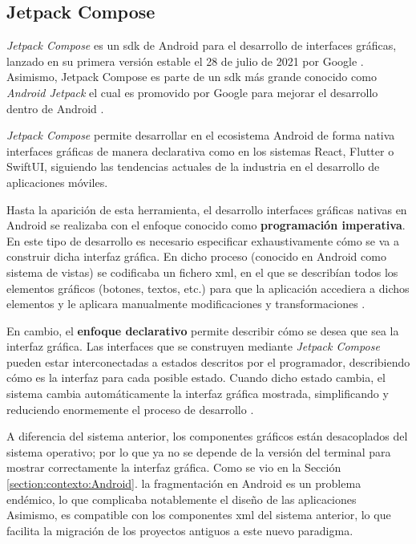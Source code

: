     \subsection{Jetpack Compose}

        \textit{Jetpack Compose} es un \gls{sdk} de Android para el desarrollo de interfaces gráficas, lanzado en su primera versión estable el 28 de julio de 2021 por Google \cite{bellini_jetpack_2021}. Asimismo, Jetpack Compose es parte de un \gls{sdk} más grande conocido como \textit{Android Jetpack} el cual es promovido por Google para mejorar el desarrollo dentro de Android \cite{huaman_que_2018} \cite{android_developers_recursos_nodate}. 
        
        \textit{Jetpack Compose} permite desarrollar en el ecosistema Android de forma nativa interfaces gráficas de manera declarativa como en los sistemas React, Flutter o SwiftUI, siguiendo las tendencias actuales de la industria en el desarrollo de aplicaciones móviles. 

        Hasta la aparición de esta herramienta, el desarrollo interfaces gráficas nativas en Android se realizaba con el enfoque conocido como \textbf{programación imperativa}. En este tipo de desarrollo es necesario especificar exhaustivamente cómo se va a construir dicha interfaz gráfica. En dicho proceso (conocido en Android como sistema de vistas) se codificaba un fichero \gls{xml}, en el que se describían todos los elementos gráficos (botones, textos, etc.) para que la aplicación accediera a dichos elementos y le aplicara manualmente modificaciones y transformaciones \cite{deloitte_spain_programacion_2021}. 

        En cambio, el \textbf{enfoque declarativo} permite describir cómo se desea que sea la interfaz gráfica. Las interfaces que se construyen mediante \textit{Jetpack Compose} pueden estar interconectadas a estados descritos por el programador, describiendo cómo es la interfaz para cada posible estado. Cuando dicho estado cambia, el sistema cambia automáticamente la interfaz gráfica mostrada, simplificando y reduciendo enormemente el proceso de desarrollo \cite{leiva_que_2021}. 

        A diferencia del sistema anterior, los componentes gráficos están desacoplados 
        del sistema operativo; por lo que ya no se depende de la versión del terminal para mostrar correctamente la interfaz gráfica. Como se vio en la Sección \ref{section:contexto:Android}. la fragmentación en Android es un problema endémico, lo que complicaba notablemente el diseño de las aplicaciones Asimismo, es compatible con los componentes \gls{xml} del sistema anterior, lo que facilita la migración de los proyectos antiguos a este nuevo paradigma. 


